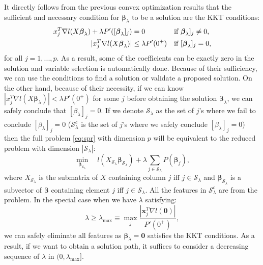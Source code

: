It directly follows from the previous convex optimization results that the sufficient and necessary condition for $\boldsymbol\beta_{\lambda}$ to be a solution are the KKT conditions:
\begin{align*}
    x_j^T\nabla l(X\boldsymbol\beta_\lambda)+\lambda P'([\boldsymbol \beta_\lambda]_j)&=0 &&\textnormal{if }\boldsymbol \beta_\lambda]_j\neq 0,\\
    |x_j^T\nabla l(X\boldsymbol\beta_\lambda)|&\leq \lambda P'(0^+) &&\textnormal{if }[\boldsymbol \beta_\lambda]_j= 0,
\end{align*}
for all $j=1,...,p$. As a result, some of the coefficients can be exactly zero in the solution and variable selection is automatically done. Because of their sufficiency, we can use the conditions to find a solution or validate a proposed solution. On the other hand, because of their necessity, if we can know $|x_j^T\nabla l(X\boldsymbol\beta_\lambda)|< \lambda P'(0^+)$ for some $j$ before obtaining the solution $\boldsymbol\beta_\lambda$, we can safely conclude that $[\beta_\lambda]_j=0$. If we denote $\mathcal{S}_\lambda$ as the set of $j$'s where we fail to conclude $[\beta_\lambda]_j=0$ ($\mathcal{S}_\lambda^c$ is the set of $j$'s where we safely conclude  $[\beta_\lambda]_j=0$) then the full problem \eqref{eq:spr} with dimension $p$ will be equivalent to the reduced problem with dimension $|\mathcal{S}_\lambda|$:
\begin{equation}
    \underset{\boldsymbol\beta_{\mathcal{S}_\lambda}}{\min}\quad l(X_{\mathcal{S}_\lambda}\boldsymbol\beta_{\mathcal{S}_\lambda})+\lambda \sum_{j\in\mathcal{S}_\lambda}P(\boldsymbol\beta_j),
\end{equation}
where $X_{\mathcal{S}_\lambda}$ is the submatrix of $X$ containing column $j$ iff $j\in\mathcal{S}_\lambda$ and $\boldsymbol\beta_{\mathcal{S}_\lambda}$ is a subvector of $\boldsymbol\beta$ containing element $j$ iff $j\in\mathcal{S}_\lambda$. All the features in $\mathcal{S}_\lambda^c$ are  from the problem. In the special case when we have $\lambda$ satisfying:
\begin{equation}
    \lambda\geq\lambda_{\max}\equiv \underset{j}{\max}\frac{|\boldsymbol x_j^T\nabla l(\boldsymbol0)|}{P'(0^+)},
\end{equation}
we can safely eliminate all features as $\boldsymbol\beta_{\lambda}=\boldsymbol0$ satisfies the KKT conditions. As a result, if we want to obtain a solution path, it suffices to consider a decreasing sequence of $\lambda$ in $(0,\lambda_{\max}]$.

